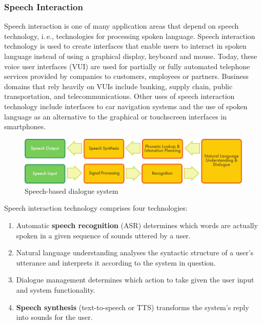 \documentclass[]{../../metanetpaper}
\begin{document}
\begin{multicols}{2}
\subsubsection{Speech Interaction}

Speech interaction is one of many application areas that depend on speech technology, i.\,e., technologies for processing spoken language. Speech interaction technology is used to create interfaces that enable users to interact in spoken language instead of using a graphical display, keyboard and mouse.  Today, these voice user interfaces (VUI) are used for partially or fully automated telephone services provided by companies to customers, employees or partners. Business domains that rely heavily on VUIs include banking, supply chain, public transportation, and telecommunications. Other uses of speech interaction technology include interfaces to car navigation systems and the use of spoken language as an alternative to the graphical or touchscreen interfaces in smartphones.

\begin{figure}[htb]
  \center
  \includegraphics[width=\textwidth]{../_media/english/simple_speech-based_dialogue_architecture}
  \caption{Speech-based dialogue system}
  \label{fig:dialoguearch_en}
\end{figure}

Speech interaction technology comprises four technologies: 

\begin{enumerate}
\item Automatic \textbf{speech recognition} (ASR) determines which words are actually spoken in a given sequence of sounds uttered by a user.  
\item Natural language understanding analyses the syntactic structure of a user's utterance and interprets it according to the system in question.
\item Dialogue management determines which action to take given the user input and system functionality.   
\item \textbf{Speech synthesis} (text-to-speech or TTS) transforms the system's reply into sounds for the user.
\end{enumerate}


\end{multicols}
\end{document}
